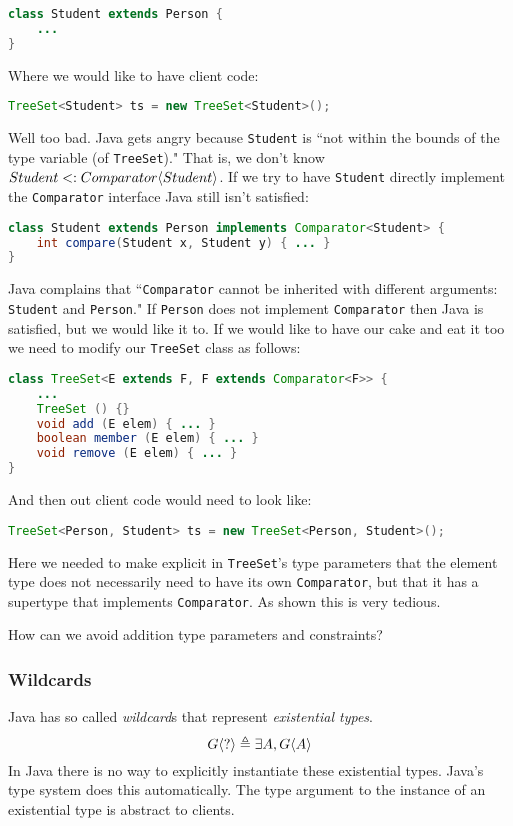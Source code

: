 \documentclass{article}
\begin{document}
\begin{example}
\begin{lstlisting}[escapechar=|, language=Java]
class Student extends Person {
    ...
}
\end{lstlisting}
Where we would like to have client code:
\begin{lstlisting}[escapechar=|, language=Java]
TreeSet<Student> ts = new TreeSet<Student>();
\end{lstlisting}
Well too bad.
Java gets angry because \texttt{Student} is ``not within the bounds of the type variable (of \texttt{TreeSet})."
That is, we don't know $Student <: Comparator \langle Student \rangle$.
If we try to have \texttt{Student} directly implement the \texttt{Comparator} interface Java still isn't satisfied:
\begin{lstlisting}[escapechar=|, language=Java]
class Student extends Person implements Comparator<Student> {
    int compare(Student x, Student y) { ... }
}
\end{lstlisting}
Java complains that ``\texttt{Comparator} cannot be inherited with different arguments: \texttt{Student} and \texttt{Person}."
If \texttt{Person} does not implement \texttt{Comparator} then Java is satisfied, but we would like it to.
If we would like to have our cake and eat it too we need to modify our \texttt{TreeSet} class as follows:
\begin{lstlisting}[escapechar=|, language=Java]
class TreeSet<E extends F, F extends Comparator<F>> {
    ...
    TreeSet () {}
    void add (E elem) { ... }
    boolean member (E elem) { ... }
    void remove (E elem) { ... }
}
\end{lstlisting}
And then out client code would need to look like:
\begin{lstlisting}[escapechar=|, language=Java]
TreeSet<Person, Student> ts = new TreeSet<Person, Student>();
\end{lstlisting}
Here we needed to make explicit in \texttt{TreeSet}'s type parameters that the element type does not necessarily need to have its own \texttt{Comparator}, but that it has a supertype that implements \texttt{Comparator}.
As shown this is very tedious.
\end{example}

How can we avoid addition type parameters and constraints?

\subsubsection{Wildcards}

\begin{definition}[Wildcards]
Java has so called \textit{wildcard}s that represent \textit{existential types}.
\begin{equation}
G \langle ? \rangle \triangleq \exists A, G \langle A \rangle
\end{equation}
In Java there is no way to explicitly instantiate these existential types.
Java's type system does this automatically.
The type argument to the instance of an existential type is abstract to clients.
\end{definition}
\end{document}
